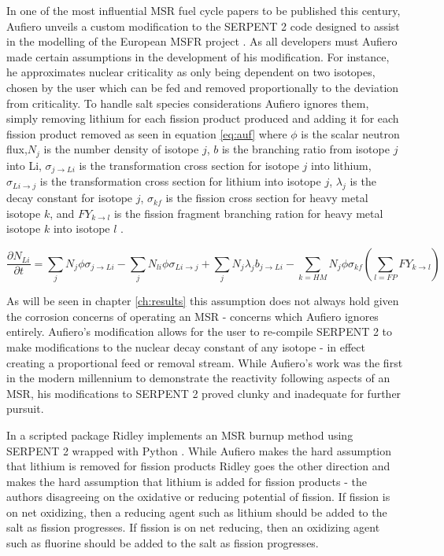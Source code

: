 In one of the most influential MSR fuel cycle papers to be published this
century, Aufiero unveils a custom modification to the SERPENT 2 code designed to
assist in the modelling of the European MSFR project \cite{Aufiero}. As all
developers must Aufiero made certain assumptions in the development of his
modification. For instance, he
 approximates nuclear criticality as only being dependent 
on two isotopes, chosen by the user which can be fed and removed proportionally
to the deviation from criticality. To handle salt species considerations Aufiero
ignores them, simply removing lithium for each fission product produced and
adding it for each fission product removed as seen in equation \ref{eq:auf} 
where $\phi$ is the scalar neutron flux,$N_{j}$ is the number density of
isotope $j$, $b$ is the branching ratio
from isotope $j$ into Li, $\sigma_{j \rightarrow Li}$ is the transformation
cross section for isotope $j$ into lithium, $\sigma_{Li \rightarrow j}$ is the
transformation cross section for lithium into isotope $j$, $\lambda_{j}$ is
the decay constant for isotope $j$, $\sigma_{kf}$ is the fission cross section
for heavy metal isotope $k$, and $FY_{k \rightarrow l}$ is the fission
fragment branching ration for heavy metal isotope $k$ into isotope $l$ \cite{Aufiero}. 

\begin{equation} \label{eq:auf}
\frac{\partial N_{Li}}{\partial t} = \sum_{j} N_{j} \phi \sigma_{j \rightarrow
    Li} - \sum_{j} N_{li} \phi \sigma_{Li \rightarrow j} + \sum_{j} N_{j}
    \lambda_{j} b_{j \rightarrow Li} - \sum_{k = HM} N_{j} \phi \sigma_{kf}
    \left ( \sum_{l=FP}FY_{k \rightarrow l} \right )
\end{equation}

As will be seen in chapter \ref{ch:results} this assumption does not always hold
given the corrosion concerns of operating an MSR - concerns which Aufiero ignores
entirely. Aufiero's modification allows for the user to re-compile SERPENT 2 to
make modifications to the nuclear decay constant of any isotope - in effect 
creating a proportional feed or removal stream. While Aufiero's work was the
first in the modern millennium to demonstrate the reactivity following aspects
of an MSR, his modifications to SERPENT 2 proved clunky and inadequate for
further pursuit.

In a scripted package Ridley implements an MSR burnup method using SERPENT 2
wrapped with Python \cite{Ridley}. 
While Aufiero makes the hard assumption that lithium is
removed for fission products Ridley goes the other direction and makes the
hard assumption that lithium is added for fission products - the authors
disagreeing on the oxidative or reducing potential of fission. If fission is on
net oxidizing, then a reducing agent such as lithium should be added to the salt
as fission progresses. If fission is on net reducing, then an oxidizing agent
such as fluorine should be added to the salt as fission progresses. 

